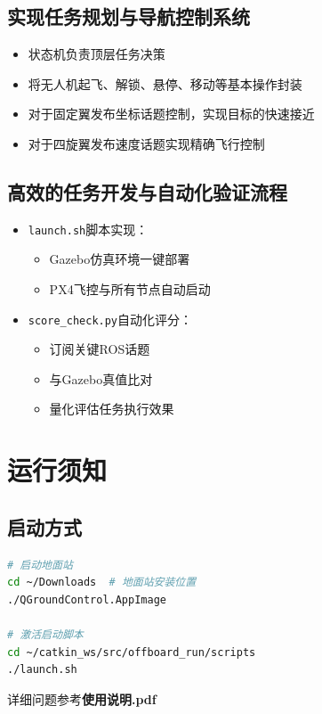 \documentclass[12pt]{article}
\begin{document}
\subsection{实现任务规划与导航控制系统}
\begin{itemize}
    \item 状态机负责顶层任务决策
    \item 将无人机起飞、解锁、悬停、移动等基本操作封装
    \item 对于固定翼发布坐标话题控制，实现目标的快速接近
    \item 对于四旋翼发布速度话题实现精确飞行控制
\end{itemize}

\subsection{高效的任务开发与自动化验证流程}
\begin{itemize}
    \item \texttt{launch.sh}脚本实现：
    \begin{itemize}
        \item Gazebo仿真环境一键部署
        \item PX4飞控与所有节点自动启动
    \end{itemize}
    \item \texttt{score\_check.py}自动化评分：
    \begin{itemize}
        \item 订阅关键ROS话题
        \item 与Gazebo真值比对
        \item 量化评估任务执行效果
    \end{itemize}
\end{itemize}

\section{运行须知}
\subsection{启动方式}
\begin{lstlisting}[language=bash]
# 启动地面站
cd ~/Downloads  # 地面站安装位置
./QGroundControl.AppImage

# 激活启动脚本
cd ~/catkin_ws/src/offboard_run/scripts
./launch.sh
\end{lstlisting}
详细问题参考\textbf{使用说明.pdf}
\end{document}
